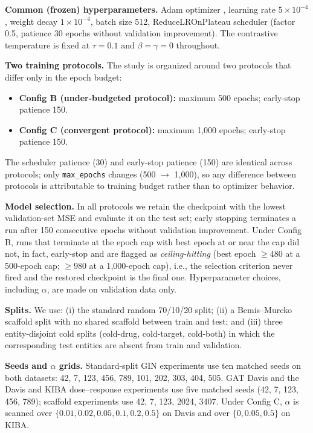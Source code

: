 \documentclass[10pt,a4paper,twocolumn]{article}
\begin{document}
\textbf{Common (frozen) hyperparameters.} Adam optimizer \cite{kingma2015adam}, learning rate $5 \times 10^{-4}$, weight decay $1 \times 10^{-4}$, batch size 512, ReduceLROnPlateau scheduler (factor 0.5, patience 30 epochs without validation improvement). The contrastive temperature is fixed at $\tau=0.1$ and $\beta=\gamma=0$ throughout.

\textbf{Two training protocols.} The study is organized around two protocols that differ only in the epoch budget:
\begin{itemize}
\item \textbf{Config B (under-budgeted protocol):} maximum 500 epochs; early-stop patience 150.
\item \textbf{Config C (convergent protocol):} maximum 1{,}000 epochs; early-stop patience 150.
\end{itemize}
The scheduler patience (30) and early-stop patience (150) are identical across protocols; only \texttt{max\_epochs} changes (500 $\to$ 1{,}000), so any difference between protocols is attributable to training budget rather than to optimizer behavior.

\textbf{Model selection.} In all protocols we retain the checkpoint with the lowest validation-set MSE and evaluate it on the test set; early stopping terminates a run after 150 consecutive epochs without validation improvement. Under Config B, runs that terminate at the epoch cap with best epoch at or near the cap did not, in fact, early-stop and are flagged as \textit{ceiling-hitting} (best epoch $\geq 480$ at a 500-epoch cap; $\geq 980$ at a 1{,}000-epoch cap), i.e., the selection criterion never fired and the restored checkpoint is the final one. Hyperparameter choices, including $\alpha$, are made on validation data only.

\textbf{Splits.} We use: (i) the standard random 70/10/20 split; (ii) a Bemis--Murcko scaffold split with no shared scaffold between train and test; and (iii) three entity-disjoint cold splits (cold-drug, cold-target, cold-both) in which the corresponding test entities are absent from train and validation.

\textbf{Seeds and $\alpha$ grids.} Standard-split GIN experiments use ten matched seeds on both datasets: 42, 7, 123, 456, 789, 101, 202, 303, 404, 505. GAT Davis and the Davis and KIBA dose--response experiments use five matched seeds (42, 7, 123, 456, 789); scaffold experiments use 42, 7, 123, 2024, 3407. Under Config C, $\alpha$ is scanned over $\{0.01, 0.02, 0.05, 0.1, 0.2, 0.5\}$ on Davis and over $\{0, 0.05, 0.5\}$ on KIBA.
\end{document}
